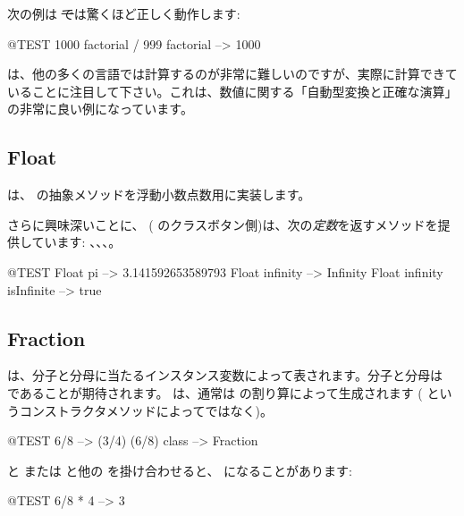 \documentclass[a4paper,10pt,twoside]{book}
\begin{document}
次の例は \st では驚くほど正しく動作します:
\begin{code}{@TEST}
1000 factorial / 999 factorial --> 1000
\end{code}
 は、他の多くの言語では計算するのが非常に難しいのですが、実際に計算できていることに注目して下さい。これは、数値に関する「自動型変換と正確な演算」の非常に良い例になっています。


\subsection{Float}

 は、 の抽象メソッドを浮動小数点数用に実装します。

さらに興味深いことに、 (\ie{} のクラスボタン側)は、次の\emph{定数}を返すメソッドを提供しています: 、、、。

\begin{code}{@TEST}
Float pi                      --> 3.141592653589793
Float infinity               --> Infinity
Float infinity isInfinite --> true
\end{code}

\subsection{Fraction}

 は、分子と分母に当たるインスタンス変数によって表されます。分子と分母は  であることが期待されます。 は、通常は  の割り算によって生成されます ( というコンストラクタメソッドによってではなく)。

\begin{code}{@TEST}
6/8             --> (3/4)
(6/8) class --> Fraction
\end{code}

 と  または  と他の  を掛け合わせると、 になることがあります:

\begin{code}{@TEST}
6/8 * 4 --> 3
\end{code}
\end{document}
